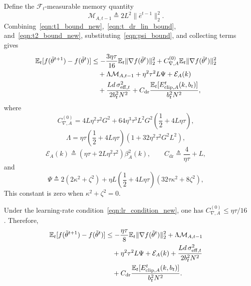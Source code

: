 \documentclass[journal]{IEEEtran}
\begin{document}
Define the $\mathcal{F}_t$-measurable memory quantity
\begin{equation}
    \mathcal{M}_{A,t-1}\triangleq 2L^2\|\bar e^{t-1}\|_2^2.
\end{equation}
Combining~\eqref{eqn:t1_bound_new},~\eqref{eqn:t_dr_lin_bound}, and~\eqref{eqn:t2_bound_new}, substituting~\eqref{eqn:psi_bound}, and collecting terms gives
\begin{align}
    \mathbb{E}_t[f(\tilde\theta^{t+1})-f(\tilde\theta^t)]
    &\le
    -\frac{3\eta\tau}{16}\mathbb{E}_t\|\nabla f(\tilde\theta^t)\|_2^2
    +C_{\nabla,A}^{(0)}\mathbb{E}_t\|\nabla f(\tilde\theta^t)\|_2^2
    \notag\\
    &\quad+
    \Lambda\mathcal{M}_{A,t-1}
    +\eta^2\tau^2L\Psi
    +\mathcal{E}_A(k)
    \notag\\
    &\quad+
    \frac{Ld\,\sigma_{\mathrm{eff},t}^2}{2b_t^2N^2}
    +C_{\mathrm{dr}}\frac{\mathbb{E}_t[E_{\mathrm{clip},A}^t(k,b_t)]}{b_t^2N^2},
\end{align}
where
\begin{equation}
    C_{\nabla,A}^{(0)}
    =4L\eta^2\tau^2G^2
    +64\eta^3\tau^3L^2G^2\left(\frac12+4L\eta\tau\right),
\end{equation}
\begin{equation}
    \Lambda
    =\eta\tau\left(\frac12+4L\eta\tau\right)
    \left(1+32\eta^2\tau^2G^2L^2\right),
\end{equation}
\begin{equation}
    \mathcal{E}_A(k)
    \triangleq
    (\eta\tau+2L\eta^2\tau^2)\beta_A^2(k),
    \qquad
    C_{\mathrm{dr}}\triangleq \frac{4}{\eta\tau}+L,
\end{equation}
and
\begin{equation}
    \Psi
    \triangleq
    2(2\kappa^2+\zeta^2)
    +\eta L\left(\frac12+4L\eta\tau\right)
    (32\tau\kappa^2+8\zeta^2),
\end{equation}
This constant is zero when $\kappa^2+\zeta^2=0$.

Under the learning-rate condition~\eqref{eqn:lr_condition_new}, one has $C_{\nabla,A}^{(0)}\le \eta\tau/16$. Therefore,
\begin{align}
    \label{eqn:single_step_descent_new}
    \mathbb{E}_t[f(\tilde\theta^{t+1})-f(\tilde\theta^t)]
    &\le
    -\frac{\eta\tau}{8}\mathbb{E}_t\|\nabla f(\tilde\theta^t)\|_2^2
    +\Lambda\mathcal{M}_{A,t-1}
    \notag\\
    &\quad+
    \eta^2\tau^2L\Psi
    +\mathcal{E}_A(k)
    +\frac{Ld\,\sigma_{\mathrm{eff},t}^2}{2b_t^2N^2}
    \notag\\
    &\quad+
    C_{\mathrm{dr}}\frac{\mathbb{E}_t[E_{\mathrm{clip},A}^t(k,b_t)]}{b_t^2N^2}.
\end{align}
\end{document}
